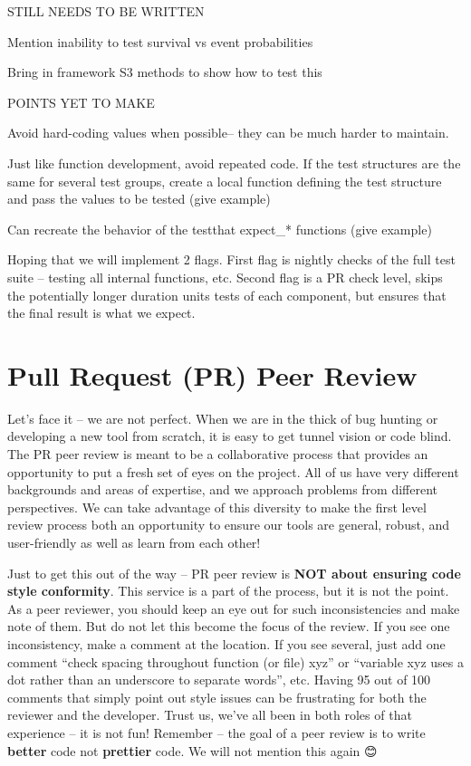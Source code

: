 \documentclass[
]{book}
\begin{document}
STILL NEEDS TO BE WRITTEN

Mention inability to test survival vs event probabilities

Bring in framework S3 methods to show how to test this

POINTS YET TO MAKE

Avoid hard-coding values when possible-- they can be much harder to maintain.

Just like function development, avoid repeated code. If the test structures are the same for several test groups, create a local function defining the test structure and pass the values to be tested (give example)

Can recreate the behavior of the testthat expect\_* functions (give example)

Hoping that we will implement 2 flags. First flag is nightly checks of the full test suite -- testing all internal functions, etc. Second flag is a PR check level, skips the potentially longer duration units tests of each component, but ensures that the final result is what we expect.

\hypertarget{pull-request-pr-peer-review}{%
\chapter{Pull Request (PR) Peer Review}\label{pull-request-pr-peer-review}}

Let's face it -- we are not perfect. When we are in the thick of bug hunting or developing a new tool from scratch, it is easy to get tunnel vision or code blind. The PR peer review is meant to be a collaborative process that provides an opportunity to put a fresh set of eyes on the project. All of us have very different backgrounds and areas of expertise, and we approach problems from different perspectives. We can take advantage of this diversity to make the first level review process both an opportunity to ensure our tools are general, robust, and user-friendly as well as learn from each other!

Just to get this out of the way -- PR peer review is \textbf{NOT about ensuring code style conformity}. This service is a part of the process, but it is not the point. As a peer reviewer, you should keep an eye out for such inconsistencies and make note of them. But do not let this become the focus of the review. If you see one inconsistency, make a comment at the location. If you see several, just add one comment ``check spacing throughout function (or file) xyz'' or ``variable xyz uses a dot rather than an underscore to separate words'', etc. Having 95 out of 100 comments that simply point out style issues can be frustrating for both the reviewer and the developer. Trust us, we've all been in both roles of that experience -- it is not fun! Remember -- the goal of a peer review is to write \textbf{better} code not \textbf{prettier} code. We will not mention this again 😊
\end{document}
